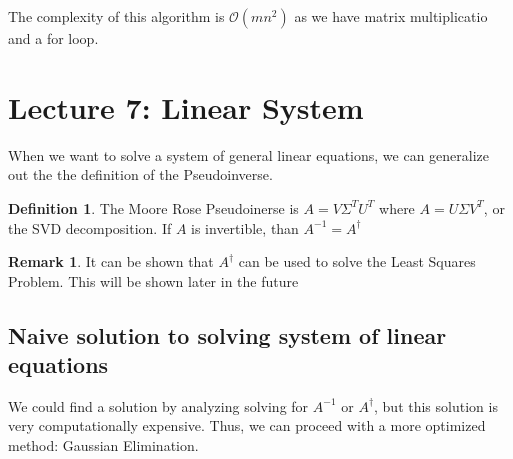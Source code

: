 \documentclass[11pt]{article}
\theoremstyle{definition}
\newtheorem{definition}{Definition}[section]
\newtheorem{remark}{Remark}[section]
\begin{document}
The complexity of this algorithm is $\mathcal{O}(mn^2)$ as we have matrix multiplicatio and a for loop. 
\section{Lecture 7: Linear System}
When we want to solve a system of general linear equations, we can generalize out the the definition of the Pseudoinverse. 
\begin{definition}
  The Moore Rose Pseudoinerse is $A = V \Sigma^T U^T$ where $A = U\Sigma V^T$, or the SVD decomposition. If $A$ is invertible, than $A^{-1} = A^{\dagger}$ 
\end{definition}
\begin{remark}
  It can be shown that $A^\dagger$ can be used to solve the Least Squares Problem. This will be shown later in the future 
\end{remark}
\subsection{Naive solution to solving system of linear equations}
We could find a solution by analyzing solving for $A^{-1}$ or $A^\dagger$, but this solution is very computationally expensive. Thus, we can proceed with a more optimized method: Gaussian Elimination.  
\end{document}
